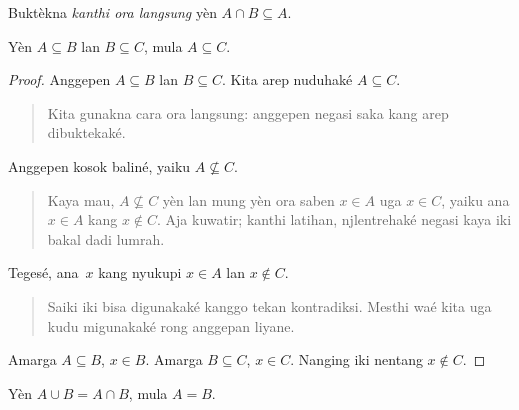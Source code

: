 \documentclass[../../../include/open-logic-section]{subfiles}
\begin{document}
\begin{prob}
Buktèkna \emph{kanthi ora langsung} yèn
$A \cap B \subseteq A$.
\end{prob}

\begin{prop}
Yèn $A \subseteq B$ lan $B \subseteq C$,
mula $A \subseteq C$.
\end{prop}

\begin{proof}
  Anggepen $A \subseteq B$ lan $B \subseteq C$.
  Kita arep nuduhaké $A
  \subseteq C$.
  \begin{quote}
    Kita gunakna cara ora langsung: anggepen
    negasi saka kang arep dibuktekaké.
  \end{quote}
  Anggepen kosok baliné, yaiku
  $A \nsubseteq C$.
  \begin{quote}
    Kaya mau, $A \nsubseteq C$ yèn lan mung
    yèn ora saben $x \in A$ uga $x \in C$,
    yaiku ana $x \in A$ kang $x \notin C$.
    Aja kuwatir; kanthi latihan, njlentrehaké
    negasi kaya iki bakal dadi lumrah.
  \end{quote}
  Tegesé, ana~$x$ kang nyukupi $x \in A$
  lan $x \notin C$.
  \begin{quote}
    Saiki iki bisa digunakaké kanggo tekan
    kontradiksi. Mesthi waé kita uga kudu
    migunakaké rong anggepan liyane.
  \end{quote}
  Amarga $A \subseteq B$, $x \in B$.
  Amarga $B \subseteq C$, $x \in
  C$. Nanging iki nentang $x \notin C$.
\end{proof}

\begin{prop}
Yèn $A \cup B = A \cap B$, mula $A = B$.
\end{prop}
\end{document}
